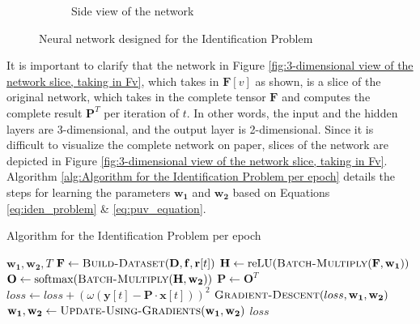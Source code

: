 \documentclass[12pt]{article}
\newcommand{\matr}[1]{\mathbf{#1}}  %
\begin{document}
\begin{figure}[!htbp]
\begin{subfigure}{.35\textwidth}
            \caption{Side view of the network}
            \label{fig:Side view of the network}
        \end{subfigure}
        \caption{Neural network designed for the Identification Problem}
        \label{fig:Neural network designed for the Identification Problem}
    \end{figure}
    It is important to clarify that the network in Figure \ref{fig:3-dimensional view of the network slice, taking in Fv}, which takes in $\matr{F}[v]$ as shown, is a slice of the original network, which takes in the complete tensor $\matr{F}$ and computes the complete result $\matr{P}^{T}$  per iteration of $t$. In other words, the input and the hidden layers are 3-dimensional, and the output layer is 2-dimensional. Since it is difficult to visualize the complete network on paper, slices of the network are depicted in Figure \ref{fig:3-dimensional view of the network slice, taking in Fv}. Algorithm \ref{alg:Algorithm for the Identification Problem per epoch} details the steps for learning the parameters $\matr{w_1}$ and $\matr{w_2}$ based on Equations \ref{eq:iden_problem} \& \ref{eq:puv_equation}.
    \begin{algorithm}
        \caption{Algorithm for the Identification Problem per epoch} \label{alg:Algorithm for the Identification Problem per epoch}
        \begin{algorithmic}[1]
            \Require $\matr{w_1}, \matr{w_2}, T$
            \Function{Identify-Weights}{$\matr{x}, \matr{y}, \matr{r}, \matr{D}, \matr{f}, \omega$}
                \State $\matr{F} \gets \Call{Build-Dataset}{\matr{D}, \matr{f}, \matr{r}[t]}$
                \State $\matr{H} \gets \text{reLU}(\Call{Batch-Multiply}{\matr{F}, \matr{w_1}})$
                \State $\matr{O} \gets \text{softmax}(\Call{Batch-Multiply}{\matr{H}, \matr{w_2}})$
                \State $\matr{P} \gets \matr{O}^T$
                \State $loss \gets loss + (\omega(\matr{y}[t] - \matr{P} \cdot \matr{x}[t]))^2$
            \EndFor
            \State $\Call{Gradient-Descent}{loss, \matr{w_1}, \matr{w_2}}$
            \State $\matr{w_1}, \matr{w_2} \gets \Call{Update-Using-Gradients}{\matr{w_1}, \matr{w_2}}$
            \State \Return $loss$
            \EndFunction
        \end{algorithmic}
    \end{algorithm}
    
\end{document}
